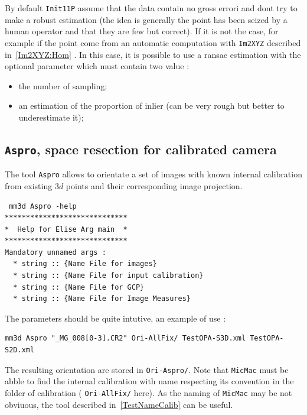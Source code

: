 By default {\tt Init11P}  assume that the data contain no gross errori and dont try
to make a robust estimation (the idea is generally the point has been seized by a human operator 
and that they are few but correct). If it is not the case, for example if the point
come from an automatic computation with {\tt Im2XYZ} described in~\ref{Im2XYZ:Hom} .
In this case, it is possible to use a ransac estimation with the optional parameter
which must contain two value :

\begin{itemize}
   \item  the number of sampling;
   \item  an estimation of the proportion of inlier (can be very rough but better to underestimate it);
\end{itemize}



\subsection{{\tt Aspro}, space resection for calibrated camera}


The tool {\tt Aspro} allows to orientate a set of images with known internal calibration
 from existing $3d$ points and their corresponding image projection.

\begin{verbatim}
 mm3d Aspro -help
*****************************
*  Help for Elise Arg main  *
*****************************
Mandatory unnamed args : 
  * string :: {Name File for images}
  * string :: {Name File for input calibration}
  * string :: {Name File for GCP}
  * string :: {Name File for Image Measures}
\end{verbatim}

The parameters should be quite intutive, an example of use :

\begin{verbatim}
mm3d Aspro "_MG_008[0-3].CR2" Ori-AllFix/ TestOPA-S3D.xml TestOPA-S2D.xml 
\end{verbatim}

The resulting orientation are stored in {\tt Ori-Aspro/}. Note that {\tt MicMac} must be abble
to find the internal calibration with name respecting its convention in the folder of calibration
( {\tt Ori-AllFix/}  here). As the naming of {\tt MicMac} may be not obviuous, the tool 
described in~\ref{TestNameCalib} can be useful.

